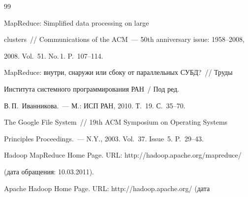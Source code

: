 \vspace*{-4pt}





{\small\frenchspacing


{\baselineskip=10.505pt




\begin{thebibliography}{99}





\vspace*{-2pt}







 MapReduce: Simplified data processing on large 


clusters~/\!\!/ Communications of the ACM~--- 50th anniversary issue: 1958--2008, 


2008.  Vol.~51. No.\,1.  P.~107--114.









MapReduce: внутри, снаружи или сбоку от параллельных СУБД?~/\!\!/  Труды 


Института системного программирования РАН~/ Под ред. 


В.\,П.~Иванникова.~--- М.: ИСП РАН, 2010. Т.~19. С.~35--70.









The Google File System~/\!\!/ 19th ACM Symposium on Operating Systems 


Principles Proceedings.~--- N.Y., 2003. Vol.~37. Issue~5. P.~29--43.







Hadoop MapReduce Home Page. URL: {\sf http:/\!\!/hadoop.apache.org/mapreduce/} 


(дата обращения: 10.03.2011).







Apache Hadoop Home Page. URL: {\sf http:/\!\!/hadoop.apache.org/} (дата 



\end{thebibliography}}}
